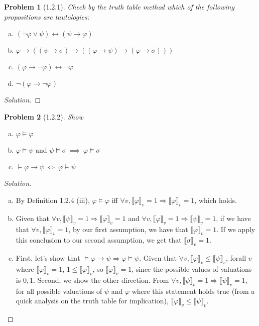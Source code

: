 \documentclass[letter]{article}
\newtheorem{problem}{Problem}
\theoremstyle{definition}
\newenvironment{solution}
{\begin{proof}[Solution]}
        {\end{proof}}
\renewcommand{\phi}{\varphi}
\begin{document}
\begin{problem}[1.2.1] Check by the truth table method which of the following propositions are tautologies:
    \begin{enumerate}[(a)]
        \item $(\neg \phi \lor \psi) \leftrightarrow (\psi \to \phi)$
        \item $\phi \to ((\psi \to \sigma)
                          \to
                          ((\phi \to \psi)
                            \to (\phi \to \sigma)
                            ))$
        \item $(\phi \to \neg \phi) \leftrightarrow \neg \phi$
        \item $\neg (\phi \to \neg \phi)$
    \end{enumerate}
\end{problem}
\begin{solution}
\end{solution}
\newcommand{\den}[1]{\llbracket #1 \rrbracket_v}
\begin{problem}[1.2.2] Show
    \begin{enumerate}[(a)]
        \item $\phi \models \phi$
        \item $\phi \models \psi \textrm{ and } \psi \models \sigma \> \implies \> \phi \models \sigma$
        \item $\models \phi \to \psi \> \iff \> \phi \models \psi$
    \end{enumerate}
\end{problem}
\begin{solution}
  \begin{enumerate}[(a)]
    \item By Definition 1.2.4 (iii), $\phi \models \phi$ iff $\forall v, \den {\phi} = 1 
    \Rightarrow \den{\phi} = 1$, which holds.
    \item Given that $\forall v, \den{\psi} = 1 \Rightarrow \den{\phi} = 1$ and
    $\forall v, \den{\phi} = 1 \Rightarrow \den{\psi} = 1$, if we have that $\forall v, \den{\phi} = 1$,
    by our first assumption, we have that $\den{\phi} = 1$. If we apply this conclusion to our second
    assumption, we get that $\den{\sigma} = 1$.
    \item First, let's show that $\models \phi \to \psi \Rightarrow \phi \models \psi$.
    Given that $\forall v, \den{\phi} \leq \den{\psi}$, forall $v$ where $\den{\phi} = 1$, 
    $1 \leq \den{\phi}$, so $\den{\phi} = 1$, since the possible values of valuations is ${0,1}$.
    Second, we show the other direction. From $\forall v, \den{\psi} = 1 \Rightarrow \den{\psi} = 1$,
    for all possible valuations of $\psi$ and $\phi$ where this statement holds true (from a quick analysis
    on the truth table for implication), $\den{\phi} \leq \den{\psi}$.
  \end{enumerate}
    
\end{solution}
\end{document}
